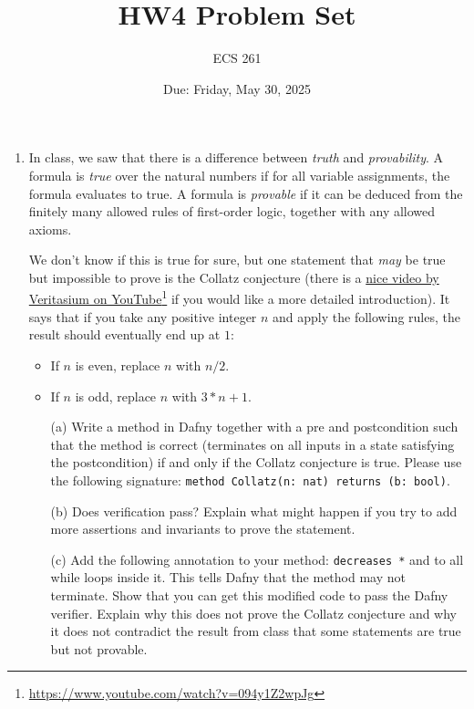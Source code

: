 \documentclass{article}
\newcommand{\visiblehref}[2]{\href{#1}{#2}\footnote{\url{#1}}}
\begin{document}
\title{HW4 Problem Set}
\author{ECS 261}
\date{Due: Friday, May 30, 2025}

\maketitle

\begin{enumerate}
\item
In class, we saw that there is a difference between
\emph{truth} and \emph{provability}. A formula is \emph{true} over the natural numbers
if for all variable assignments, the formula evaluates to true.
A formula is \emph{provable} if it can be deduced from the finitely many allowed
rules of first-order logic, together with any allowed axioms.

We don't know if this is true for sure, but one statement that \emph{may} be true but impossible to prove is the Collatz conjecture
(there is a \visiblehref{https://www.youtube.com/watch?v=094y1Z2wpJg}{nice video by Veritasium on YouTube} if you would like a more detailed introduction).
It says that if you take any positive integer $n$ and apply the following rules, the result should eventually end up at $1$:
\begin{itemize}
\item If $n$ is even, replace $n$ with $n / 2$.
\item If $n$ is odd, replace $n$ with $3 * n + 1$.
\end{itemize}

\begin{enumerate}
\item[(a)]
Write a method in Dafny together with a pre and postcondition
such that the method is correct (terminates on all inputs in a state satisfying the postcondition)
if and only if the Collatz conjecture is true. Please use the following signature: \texttt{method Collatz(n: nat) returns (b: bool)}.

\item[(b)]
Does verification pass?
Explain what might happen if you try to add more assertions and invariants to prove the statement.

\item[(c)]
Add the following annotation to your method:
\texttt{decreases *} and to all while loops inside it.
This tells Dafny that the method may not terminate.
Show that you can get this modified code to pass the Dafny verifier.
Explain why this does not prove the Collatz conjecture and why it does not contradict the result from class that some statements are true but not provable.


\end{enumerate}
\end{enumerate}
\end{document}
